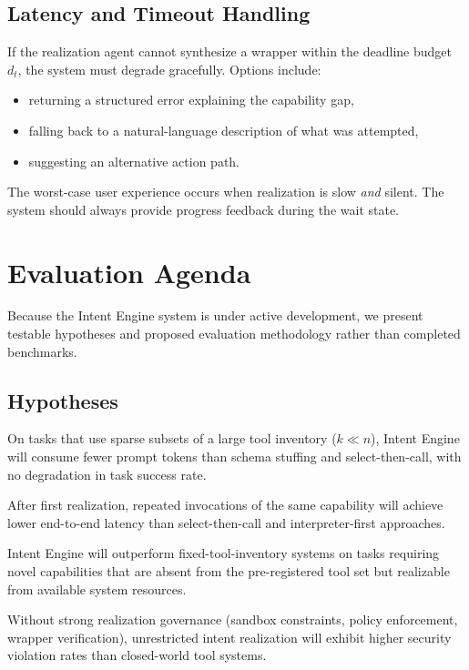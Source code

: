 \documentclass[11pt]{article}
\begin{document}
\subsection{Latency and Timeout Handling}

If the realization agent cannot synthesize a wrapper within the deadline budget $d_t$, the system must degrade gracefully. Options include:
\begin{itemize}[leftmargin=*]
  \item returning a structured error explaining the capability gap,
  \item falling back to a natural-language description of what was attempted,
  \item suggesting an alternative action path.
\end{itemize}

The worst-case user experience occurs when realization is slow \emph{and} silent. The system should always provide progress feedback during the wait state.

\section{Evaluation Agenda}
\label{sec:evaluation}

Because the Intent Engine system is under active development, we present testable hypotheses and proposed evaluation methodology rather than completed benchmarks.

\subsection{Hypotheses}

\begin{description}[leftmargin=*,style=nextline]
  \item[H1: Prompt efficiency.] On tasks that use sparse subsets of a large tool inventory ($k \ll n$), Intent Engine will consume fewer prompt tokens than schema stuffing and select-then-call, with no degradation in task success rate.

  \item[H2: Repeated-use amortization.] After first realization, repeated invocations of the same capability will achieve lower end-to-end latency than select-then-call and interpreter-first approaches.

  \item[H3: Open-ended capability.] Intent Engine will outperform fixed-tool-inventory systems on tasks requiring novel capabilities that are absent from the pre-registered tool set but realizable from available system resources.

  \item[H4: Safety-governance coupling.] Without strong realization governance (sandbox constraints, policy enforcement, wrapper verification), unrestricted intent realization will exhibit higher security violation rates than closed-world tool systems.
\end{description}
\end{document}
